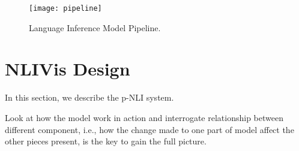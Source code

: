 \begin{figure}[htbp]
\centering
\vspace{-2mm}
 \texttt{[image: pipeline]}
 \caption{Language Inference Model Pipeline.}
\label{fig:modelPipeline}
\end{figure}

\section{NLIVis Design}
In this section, we describe the p-NLI system.

%
Look at how the model work in action and interrogate relationship between different component, i.e., how the change made to one part of model affect the other pieces present, is the key to gain the full picture.
